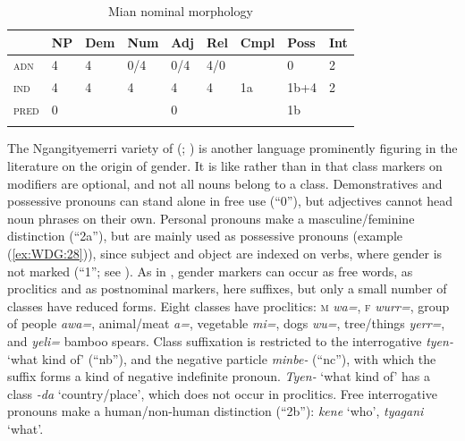 \documentclass[output=collectionpaper]{langsci/langscibook}
\begin{document}
\begin{table}
\caption{Mian nominal morphology}
\begin{tabular}{>{\scshape}l*{8}{l}}
\lsptoprule
&	NP	&	Dem	&	Num	&	Adj	&	Rel	&	Cmpl	&	Poss	&	Int	\\
\midrule
adn	&	4	&	4	&	0/4	&	0/4	&	4/0	&		&	0	&	2	\\
ind	&	4	&	4	&	4	&	4	&	4	&	1a	&	1b+4	&	2	\\
pred	&	0	&		&		&	0	&		&		&	1b	&		\\
\lspbottomrule
\end{tabular}
\label{tab:WDG:8}
\end{table}

The Ngan\textquotesingle{}gityemerri variety of  (; \citealt{Reid1990}) is another language prominently figuring in the literature on the origin of gender. It is like  rather than  in that class markers on modifiers are optional, and not all nouns belong to a class. Demonstratives and possessive pronouns can stand alone in free use (``0''), but adjectives cannot head noun phrases on their own. Personal pronouns make a masculine/feminine distinction (``2a''), but are mainly used as possessive pronouns (example (\ref{ex:WDG:28})), since subject and object are indexed on verbs, where gender is not marked (``1''; see ). As in , gender markers can occur as free words, as proclitics and as postnominal markers, here suffixes, but only a small number of classes have reduced forms. Eight classes have proclitics: \textsc{m} \textit{wa=}, \textsc{f} \textit{wurr=}, group of people \textit{awa=}, animal/meat \textit{a=}, vegetable \textit{mi=}, dogs \textit{wu=}, tree/things \textit{yerr=}, and \textit{yeli=} bamboo spears. Class suffixation is restricted to the interrogative \textit{tyen-} `what kind of' (``nb''), and the negative particle \textit{minbe-} (``nc''), with which the suffix forms a kind of negative indefinite pronoun. \textit{Tyen-} `what kind of' has a class \textit{-da} `country/place', which does not occur in proclitics. Free interrogative pronouns make a human/non-human distinction (``2b''): \textit{kene} `who', \textit{tyagani} `what'.

\begin{table}
\caption{Ngan\textquotesingle{}gityemerri Nangikurrunggurr nominal morphology\label{tab:WDG:9}}
\end{table}
\end{document}
